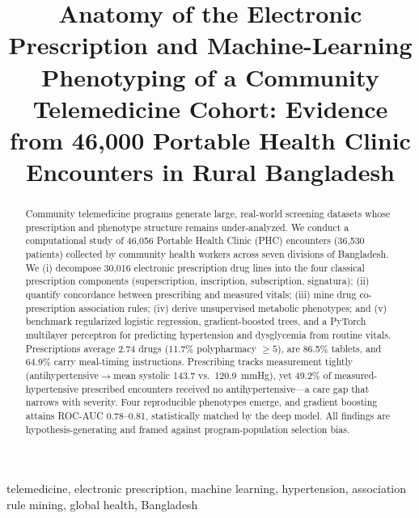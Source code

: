 \documentclass[conference]{IEEEtran}
\begin{document}
\title{Anatomy of the Electronic Prescription and Machine-Learning Phenotyping of a Community Telemedicine Cohort: Evidence from 46{,}000 Portable Health Clinic Encounters in Rural Bangladesh}

\author{
}

\maketitle

\begin{abstract}
Community telemedicine programs generate large, real-world screening datasets whose prescription and phenotype structure remains under-analyzed. We conduct a computational study of 46{,}056 Portable Health Clinic (PHC) encounters (36{,}530 patients) collected by community health workers across seven divisions of Bangladesh. We (i) decompose 30{,}016 electronic prescription drug lines into the four classical prescription components (superscription, inscription, subscription, signatura); (ii) quantify concordance between prescribing and measured vitals; (iii) mine drug co-prescription association rules; (iv) derive unsupervised metabolic phenotypes; and (v) benchmark regularized logistic regression, gradient-boosted trees, and a PyTorch multilayer perceptron for predicting hypertension and dysglycemia from routine vitals. Prescriptions average 2.74 drugs (11.7\% polypharmacy $\geq5$), are 86.5\% tablets, and 64.9\% carry meal-timing instructions. Prescribing tracks measurement tightly (antihypertensive$\rightarrow$mean systolic 143.7 vs.\ 120.9~mmHg), yet 49.2\% of measured-hypertensive prescribed encounters received no antihypertensive---a care gap that narrows with severity. Four reproducible phenotypes emerge, and gradient boosting attains ROC-AUC 0.78--0.81, statistically matched by the deep model. All findings are hypothesis-generating and framed against program-population selection bias.
\end{abstract}

\begin{IEEEkeywords}
telemedicine, electronic prescription, machine learning, hypertension, association rule mining, global health, Bangladesh
\end{IEEEkeywords}
\end{document}
